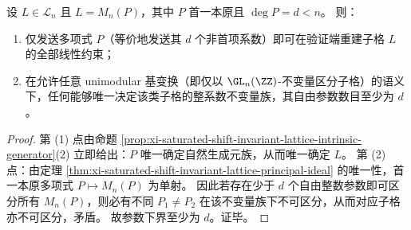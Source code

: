 \begin{proposition}\label{prop:xi-syndrome-certificate-incompressibility}
设 \(L\in\mathcal L_n\) 且 \(L=M_n(P)\)，其中 \(P\) 首一本原且 \(\deg P=d<n\)。
则：
\begin{enumerate}
  \item 仅发送多项式 \(P\)（等价地发送其 \(d\) 个非首项系数）即可在验证端重建子格 \(L\) 的全部线性约束；
  \item 在允许任意 unimodular 基变换（即仅以 \(\GL_n(\ZZ)\)-不变量区分子格）的语义下，任何能够唯一决定该类子格的整系数不变量族，其自由参数数目至少为 \(d\)。
\end{enumerate}
\end{proposition}
\begin{proof}
第 (1) 点由命题 \ref{prop:xi-saturated-shift-invariant-lattice-intrinsic-generator}(2) 立即给出：\(P\) 唯一确定自然生成元族，从而唯一确定 \(L\)。
第 (2) 点：由定理 \ref{thm:xi-saturated-shift-invariant-lattice-principal-ideal} 的唯一性，首一本原多项式 \(P\mapsto M_n(P)\) 为单射。
因此若存在少于 \(d\) 个自由整数参数即可区分所有 \(M_n(P)\)，则必有不同 \(P_1\neq P_2\) 在该不变量族下不可区分，从而对应子格亦不可区分，矛盾。
故参数下界至少为 \(d\)。证毕。
\end{proof}

